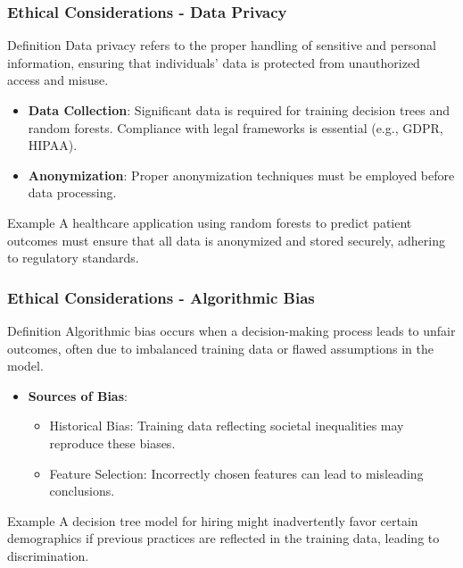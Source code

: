 \documentclass[aspectratio=169]{beamer}
\begin{document}
\begin{frame}[fragile]
    \frametitle{Ethical Considerations - Data Privacy}
    \begin{block}{Definition}
        Data privacy refers to the proper handling of sensitive and personal information, ensuring that individuals' data is protected from unauthorized access and misuse.
    \end{block}
    
    \begin{itemize}
        \item \textbf{Data Collection}: Significant data is required for training decision trees and random forests. Compliance with legal frameworks is essential (e.g., GDPR, HIPAA).
        \item \textbf{Anonymization}: Proper anonymization techniques must be employed before data processing.
    \end{itemize}
    
    \begin{exampleblock}{Example}
        A healthcare application using random forests to predict patient outcomes must ensure that all data is anonymized and stored securely, adhering to regulatory standards.
    \end{exampleblock}
\end{frame}

\begin{frame}[fragile]
    \frametitle{Ethical Considerations - Algorithmic Bias}
    \begin{block}{Definition}
        Algorithmic bias occurs when a decision-making process leads to unfair outcomes, often due to imbalanced training data or flawed assumptions in the model.
    \end{block}
    
    \begin{itemize}
        \item \textbf{Sources of Bias}:
            \begin{itemize}
                \item Historical Bias: Training data reflecting societal inequalities may reproduce these biases.
                \item Feature Selection: Incorrectly chosen features can lead to misleading conclusions.
            \end{itemize}
    \end{itemize}
    
    \begin{exampleblock}{Example}
        A decision tree model for hiring might inadvertently favor certain demographics if previous practices are reflected in the training data, leading to discrimination.
    \end{exampleblock}
\end{frame}
\end{document}
